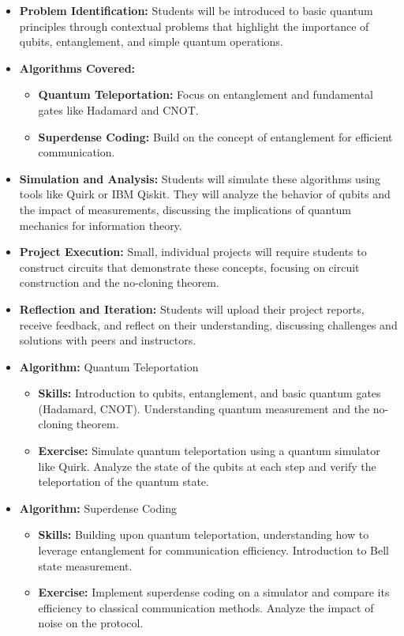 \begin{itemize}
    \item \textbf{Problem Identification:} Students will be introduced to basic quantum principles through contextual problems that highlight the importance of qubits, entanglement, and simple quantum operations.
    \item \textbf{Algorithms Covered:}
    \begin{itemize}
        \item \textbf{Quantum Teleportation:} Focus on entanglement and fundamental gates like Hadamard and CNOT.
        \item \textbf{Superdense Coding:} Build on the concept of entanglement for efficient communication.
    \end{itemize}
    \item \textbf{Simulation and Analysis:} Students will simulate these algorithms using tools like Quirk or IBM Qiskit. They will analyze the behavior of qubits and the impact of measurements, discussing the implications of quantum mechanics for information theory.
    \item \textbf{Project Execution:} Small, individual projects will require students to construct circuits that demonstrate these concepts, focusing on circuit construction and the no-cloning theorem.
    \item \textbf{Reflection and Iteration:} Students will upload their project reports, receive feedback, and reflect on their understanding, discussing challenges and solutions with peers and instructors.
\end{itemize}


\begin{itemize}
    \item \textbf{Algorithm:} Quantum Teleportation
    \begin{itemize}
        \item \textbf{Skills:} Introduction to qubits, entanglement, and basic quantum gates (Hadamard, CNOT). Understanding quantum measurement and the no-cloning theorem.
        \item \textbf{Exercise:} Simulate quantum teleportation using a quantum simulator like Quirk. Analyze the state of the qubits at each step and verify the teleportation of the quantum state.
    \end{itemize}
    
    \item \textbf{Algorithm:} Superdense Coding
    \begin{itemize}
        \item \textbf{Skills:} Building upon quantum teleportation, understanding how to leverage entanglement for communication efficiency. Introduction to Bell state measurement.
        \item \textbf{Exercise:} Implement superdense coding on a simulator and compare its efficiency to classical communication methods. Analyze the impact of noise on the protocol.
    \end{itemize}
\end{itemize}

